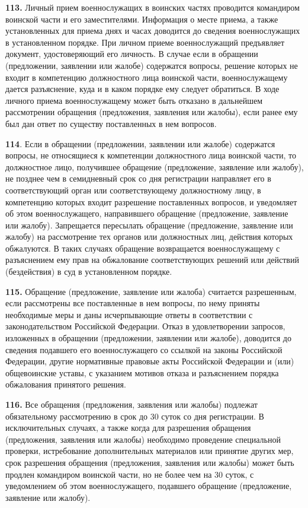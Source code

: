 \documentclass[12pt,a4paper]{report}
\begin{document}
\textbf{113.} Личный прием военнослужащих в воинских частях проводится командиром воинской части и его заместителями.
Информация о месте приема, а также установленных для приема днях и часах доводится до сведения военнослужащих в установленном порядке.
При личном приеме военнослужащий предъявляет документ, удостоверяющий его личность.
В случае если в обращении (предложении, заявлении или жалобе) содержатся вопросы, решение которых не входит в компетенцию должностного лица воинской части, военнослужащему дается разъяснение, куда и в каком порядке ему следует обратиться.
В ходе личного приема военнослужащему может быть отказано в дальнейшем рассмотрении обращения (предложения, заявления или жалобы), если ранее ему был дан ответ по существу поставленных в нем вопросов.



\textbf{114}. Если в обращении (предложении, заявлении или жалобе) содержатся вопросы, не относящиеся к компетенции должностного лица воинской части, то должностное лицо, получившее обращение (предложение, заявление или жалобу), не позднее чем в семидневный срок со дня регистрации направляет его в соответствующий орган или соответствующему должностному лицу, в компетенцию которых входит разрешение поставленных вопросов, и уведомляет об этом военнослужащего, направившего обращение (предложение, заявление или жалобу).
Запрещается пересылать обращение (предложение, заявление или жалобу) на рассмотрение тех органов или должностных лиц, действия которых обжалуются. В таких случаях обращение возвращается военнослужащему с разъяснением ему прав на обжалование соответствующих решений или действий (бездействия) в суд в установленном порядке.


\textbf{115.} Обращение (предложение, заявление или жалоба) считается разрешенным, если рассмотрены все поставленные в нем вопросы, по нему приняты необходимые меры и даны исчерпывающие ответы в соответствии с законодательством Российской Федерации.
Отказ в удовлетворении запросов, изложенных в обращении (предложении, заявлении или жалобе), доводится до сведения подавшего его военнослужащего со ссылкой на законы Российской Федерации, другие нормативные правовые акты Российской Федерации и (или) общевоинские уставы, с указанием мотивов отказа и разъяснением порядка обжалования принятого решения.



\textbf{116.} Все обращения (предложения, заявления или жалобы) подлежат обязательному рассмотрению в срок до 30 суток со дня регистрации.
В исключительных случаях, а также когда для разрешения обращения (предложения, заявления или жалобы) необходимо проведение специальной проверки, истребование дополнительных материалов или принятие других мер, срок разрешения обращения (предложения, заявления или жалобы) может быть продлен командиром воинской части, но не более чем на 30 суток, с уведомлением об этом военнослужащего, подавшего обращение (предложение, заявление или жалобу).
\end{document}
